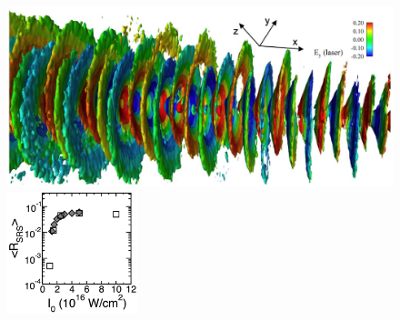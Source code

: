 \documentclass[journal,twoside]{IEEEtran}
\begin{document}


\begin{figure}
\begin{center}

\includegraphics[width=7in]{figs/lpi.eps}

\vspace{-3.75in}
\hspace{-4in}
\includegraphics[width=1.5in]{figs/lpi_comparison.eps}
\vspace{1.5in}


\end{center}
\end{figure}
\end{document}
